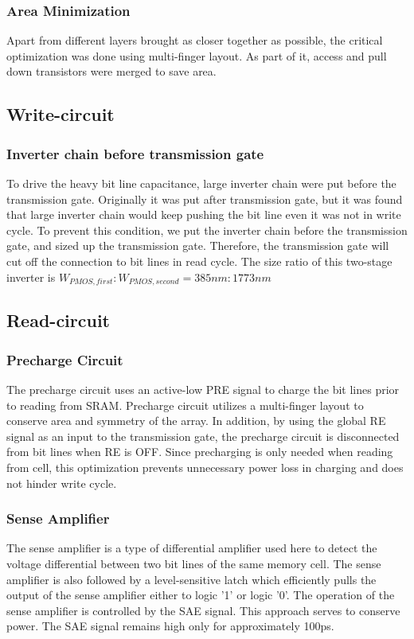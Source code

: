 \documentclass[conference]{IEEEtran}
\begin{document}
\subsubsection{Area Minimization}
Apart from different layers brought as closer together as possible, the critical optimization was done using multi-finger layout. As part of it, access and pull down transistors were merged to save area. 
\subsection{Write-circuit}
\subsubsection{Inverter chain before transmission gate}
To drive the heavy bit line capacitance, large inverter chain were put before the transmission gate. Originally it was put after transmission gate, but it was found that large inverter chain would keep pushing the bit line even it was not in write cycle. To prevent this condition, we put the inverter chain before the transmission gate, and sized up the transmission gate. Therefore, the transmission gate will cut off the connection to bit lines in read cycle. The size ratio of this two-stage inverter is $W_{PMOS, first}:W_{PMOS, second}=385nm:1773nm$
\subsection{Read-circuit}
\subsubsection{Precharge Circuit}
The precharge circuit uses an active-low PRE signal to charge the bit lines prior to reading from SRAM. Precharge circuit utilizes a multi-finger layout to conserve area and symmetry of the array. In addition, by using the global RE signal as an input to the transmission gate, the precharge circuit is disconnected from bit lines when RE is OFF. Since precharging is only needed when reading from cell, this optimization prevents unnecessary power loss in charging and does not hinder write cycle.
\subsubsection{Sense Amplifier}
The sense amplifier is a type of differential amplifier used here to detect the voltage differential between two bit lines of the same memory cell. The sense amplifier is also followed by a level-sensitive latch which efficiently pulls the output of the sense amplifier either to logic '1' or logic '0'. The operation of the sense amplifier is controlled by the SAE signal. This approach serves to conserve power. The SAE signal remains high only for approximately 100ps. 
\end{document}
